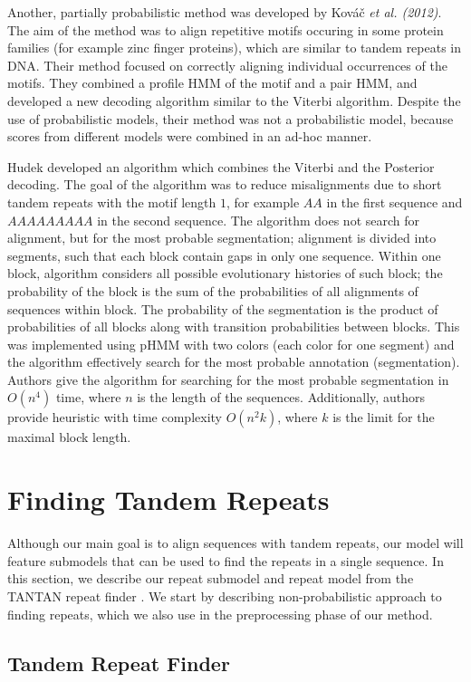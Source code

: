 Another, partially probabilistic method was developed by Kováč {\it et al.
(2012)}\nocite{Kovac2012}. The aim of the method was to align repetitive motifs
occuring in some protein families (for example zinc finger proteins), which are
similar to tandem repeats in DNA. Their method focused on correctly aligning
individual occurrences of the motifs. They combined a profile HMM of the motif
and a pair HMM, and developed a new decoding algorithm similar to the Viterbi
algorithm. Despite the use of probabilistic models, their method was not a
probabilistic model, because scores from different models were combined in an
ad-hoc manner. 

Hudek \cite{Hudek2010} developed an algorithm which combines the Viterbi and
the Posterior decoding. The goal of the algorithm was to reduce misalignments due
to short tandem repeats with the motif length $1$, for example $AA$ in the
first sequence and $AAAAAAAAA$ in the second sequence. 
The algorithm does not search for alignment, but for the most probable
segmentation; alignment is divided into segments, such that each block contain
gaps in only one sequence. Within one block, algorithm considers all possible
evolutionary histories of such block; 
the probability of the block is the sum
of the probabilities of all alignments of sequences within block. The
probability of the segmentation is the product of probabilities of all blocks
along with transition probabilities between blocks. This was implemented using
pHMM with two colors (each color for one segment) and the algorithm effectively
search for the most probable annotation (segmentation). Authors give the
algorithm for searching for the most probable segmentation in $O(n^4)$ time,
where $n$ is the length of the sequences. Additionally, authors provide
heuristic with time complexity $O(n^2k)$, where $k$ is the limit for the
maximal block length.

\section{Finding Tandem Repeats}
Although our main goal is to align sequences with tandem repeats, our model
will feature submodels that can be used to find the repeats in a single
sequence. In this section, we describe our repeat submodel and repeat model
from the TANTAN repeat finder \cite{Frith2011}. We start by describing
non-probabilistic approach to finding repeats, which we also use in the
preprocessing phase of our method.

\subsection{Tandem Repeat Finder}

